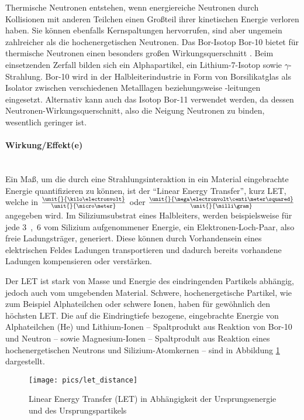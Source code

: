 Thermische Neutronen entstehen, wenn energiereiche Neutronen durch
Kollisionen mit anderen Teilchen einen Großteil ihrer kinetischen
Energie verloren haben. Sie können ebenfalls Kernspaltungen
hervorrufen, sind aber ungemein zahlreicher als die hochenergetischen
Neutronen. Das Bor-Isotop Bor-10 bietet für thermische Neutronen
einen besonders großen Wirkungsquerschnitt \cite{baumann95}. Beim
einsetzenden Zerfall bilden sich ein Alphapartikel, ein
Lithium-7-Isotop sowie $\gamma$-Strahlung. Bor-10 wird in der
Halbleiterindustrie in Form von Borsilikatglas als Isolator zwischen
verschiedenen Metalllagen beziehungsweise -leitungen
eingesetzt. Alternativ kann auch das Isotop Bor-11 verwendet werden,
da dessen Neutronen-Wirkungsquerschnitt, also die Neigung Neutronen zu
binden, wesentlich geringer ist.

\paragraph{Wirkung/Effekt(e)}\hspace{0cm}\\
\label{sec:grundlagen_softerrors_wirkung}
Ein Maß, um die durch eine Strahlungsinteraktion in ein Material
eingebrachte Energie quantifizieren zu können, ist der ``Linear Energy
Transfer'', kurz LET, welche in
$\frac{\unit{}{\kilo\electronvolt}}{\unit{}{\micro\meter}}$ oder
$\frac{\unit{}{\mega\electronvolt\centi\meter\squared}}{\unit{}{\milli\gram}}$ 
angegeben wird. Im Siliziumsubstrat eines Halbleiters, werden
beispielsweise für jede \unit{3,6}{\electronvolt} vom Silizium
aufgenommener Energie, ein Elektronen-Loch-Paar, also freie
Ladungsträger, generiert. Diese können durch Vorhandensein eines
elektrischen Feldes Ladungen transportieren und dadurch bereits
vorhandene Ladungen kompensieren oder verstärken. 

Der LET ist stark von Masse und Energie des eindringenden Partikels
abhängig, jedoch auch vom umgebenden Material. Schwere,
hochenergetische Partikel, wie zum Beispiel Alphateilchen oder schwere
Ionen, haben für gewöhnlich den höchsten LET. Die auf die
Eindringtiefe bezogene, eingebrachte Energie von Alphateilchen (He)
und Lithium-Ionen -- Spaltprodukt aus Reaktion von Bor-10 und Neutron
-- sowie Magnesium-Ionen -- Spaltprodult aus Reaktion eines
hochenergetischen Neutrons und Silizium-Atomkernen -- sind in
Abbildung \ref{fig:grundlagen_softerrors_letgraph} dargestellt. 

\begin{figure}[htbp]
	\centering
		\texttt{[image: pics/let\_distance]}
	\caption{Linear Energy Transfer (LET) in Abhängigkeit der
          Ursprungsenergie und des Ursprungspartikels \cite{baumann2005b}}
	\label{fig:grundlagen_softerrors_letgraph}
\end{figure}

